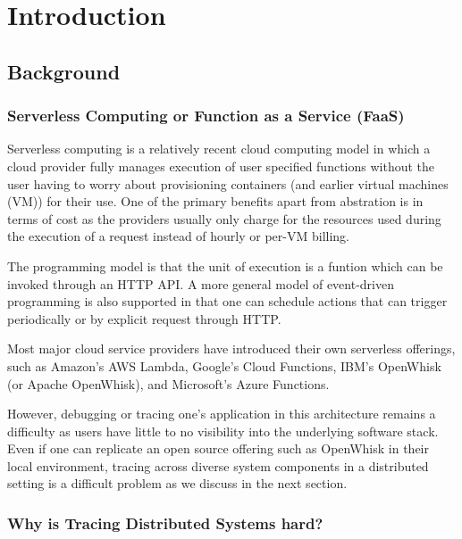 \chapter{Introduction}

\section{Background}

\subsection{Serverless Computing or Function as a Service (FaaS)}
Serverless computing is a relatively recent cloud computing model in which a cloud provider fully manages execution of user specified functions without the user having to worry about provisioning containers (and earlier virtual machines (VM)) for their use. One of the primary benefits apart from abstration is in terms of cost as the providers usually only charge for the resources used during the execution of a request instead of hourly or per-VM billing.

The programming model is that the unit of execution is a funtion which can be invoked through an HTTP API. A more general model of event-driven programming is also supported in that one can schedule actions that can trigger periodically or by explicit request through HTTP.

Most major cloud service providers have introduced their own serverless offerings, such as Amazon's AWS Lambda, Google's Cloud Functions, IBM's OpenWhisk (or Apache OpenWhisk\cite{web:wsk}), and Microsoft's Azure Functions.

However, debugging or tracing one's application in this architecture remains a difficulty as users have little to no visibility into the underlying software stack. Even if one can replicate an open source offering such as OpenWhisk in their local environment, tracing across diverse system components in a distributed setting is a difficult problem as we discuss in the next section.

\subsection{Why is Tracing Distributed Systems hard?}


